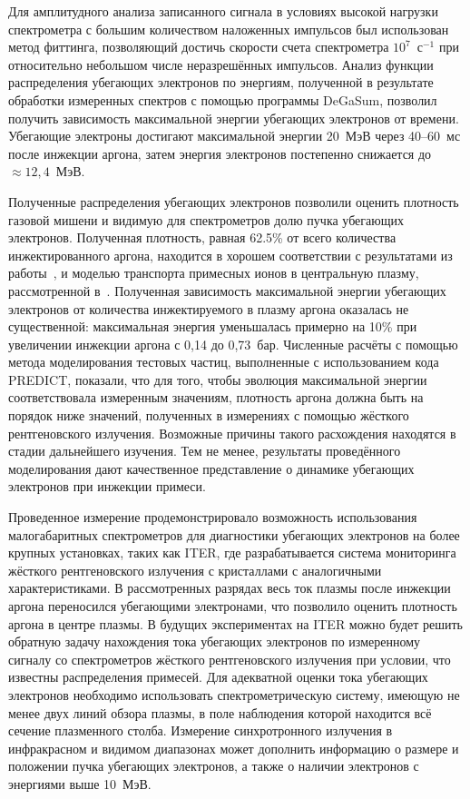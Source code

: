 Для амплитудного анализа записанного сигнала в условиях высокой нагрузки спектрометра с большим количеством наложенных импульсов был использован метод фиттинга, позволяющий достичь скорости счета спектрометра $10^7$~с${}^{-1}$ при относительно небольшом числе неразрешённых импульсов. Анализ функции распределения убегающих электронов по энергиям, полученной в результате обработки измеренных спектров с помощью программы DeGaSum, позволил получить зависимость максимальной энергии убегающих электронов от времени. Убегающие электроны достигают максимальной энергии 20~МэВ через 40--60~мс после инжекции аргона, затем энергия электронов постепенно снижается до $\approx{12,4}$~МэВ.

Полученные распределения убегающих электронов позволили оценить плотность газовой мишени и видимую для спектрометров долю пучка убегающих электронов. Полученная плотность, равная 62.5\% от всего количества инжектированного аргона, находится в хорошем соответствии с результатами из работы~\cite{Pautasso2020}, и моделью транспорта примесных ионов в центральную плазму, рассмотренной в~\cite{Linder2020}. Полученная зависимость максимальной энергии убегающих электронов от количества инжектируемого в плазму аргона оказалась не существенной: максимальная энергия уменьшалась примерно на 10\% при увеличении инжекции аргона с 0,14 до 0,73~бар. Численные расчёты с помощью метода моделирования тестовых частиц, выполненные с использованием кода PREDICT, показали, что для того, чтобы эволюция максимальной энергии соответствовала измеренным значениям, плотность аргона должна быть на порядок ниже значений, полученных в измерениях с помощью жёсткого рентгеновского излучения. Возможные причины такого расхождения находятся в стадии дальнейшего изучения. Тем не менее, результаты проведённого моделирования дают качественное представление о динамике убегающих электронов при инжекции примеси.

Проведенное измерение продемонстрировало возможность использования малогабаритных спектрометров для диагностики убегающих электронов на более крупных установках, таких как ITER, где разрабатывается система мониторинга жёсткого рентгеновского излучения с кристаллами с аналогичными характеристиками. В рассмотренных разрядах весь ток плазмы после инжекции аргона переносился убегающими электронами, что позволило оценить плотность аргона в центре плазмы. В будущих экспериментах на ITER можно будет решить обратную задачу нахождения тока убегающих электронов по измеренному сигналу со спектрометров жёсткого рентгеновского излучения при условии, что известны распределения примесей. Для адекватной оценки тока убегающих электронов необходимо использовать спектрометрическую систему, имеющую не менее двух линий обзора плазмы, в поле наблюдения которой находится всё сечение плазменного столба. Измерение синхротронного излучения в инфракрасном и видимом диапазонах может дополнить информацию о размере и положении пучка убегающих электронов, а также о наличии электронов с энергиями выше 10~МэВ.


\FloatBarrier
